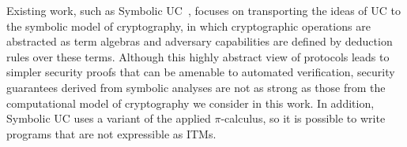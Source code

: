 Existing work, such as Symbolic UC~\cite{bohl2016symbolic}, focuses on
transporting the ideas of UC to the symbolic model of cryptography, in which
cryptographic operations are abstracted as term algebras and adversary
capabilities are defined by deduction rules over these terms. Although this
highly abstract view of protocols leads to simpler security proofs that can be
amenable to automated verification, security guarantees derived from symbolic
analyses are not as strong as those from the computational model of cryptography
we consider in this work. In addition, Symbolic UC uses a variant of the applied
$\pi$-calculus, so it is possible to write programs that are not expressible as
ITMs.

\begin{comment}
The success of blockchains and cryptocurrencies have raised interest in building
secure software systems that combine consensus protocols~\cite{miller2016honey},
zero-knowledge proofs~\cite{kosba2016hawk}, multiparty
computation~\cite{bentov2017instantaneous}, and other advanced techniques from
distributed computing and cryptography.  However, these primitives are known to
be error-prone and difficult to compose securely.  To the average developer,
reasoning about asynchronous, distributed, and adversarial deployment
environments is unnatural. On top of this, the security of a software system is
generally a whole-system property, but vulnerabilities often arise from
misunderstandings and mismatches as components are
integrated~\cite{chong2016report}.

Our solution is to develop a module system, \saucy, that will simplify the task
of composing distributed protocols and cryptographic primitives.  The novel
design idea of \saucy is to include with each module a rich behavioral
specification in the form of an \emph{ideal functionality}, which serves as a
self-contained specification of all desired security and liveness properties.
This idea is rooted in the theory of \emph{universal composability}
(UC)~\cite{canetti2001universally}, which is widely used in cryptography for
on-paper proofs, but has not yet been adapted for software engineering.  Based
on our prior experience providing formal specifications for smart contract and
blockchain protocols~\cite{bentov2017instantaneous, kosba2016hawk,
  miller2017sprites}, ideal functionalities are well-suited for modular design
of complex security-oriented applications for several reasons:


\end{comment}
